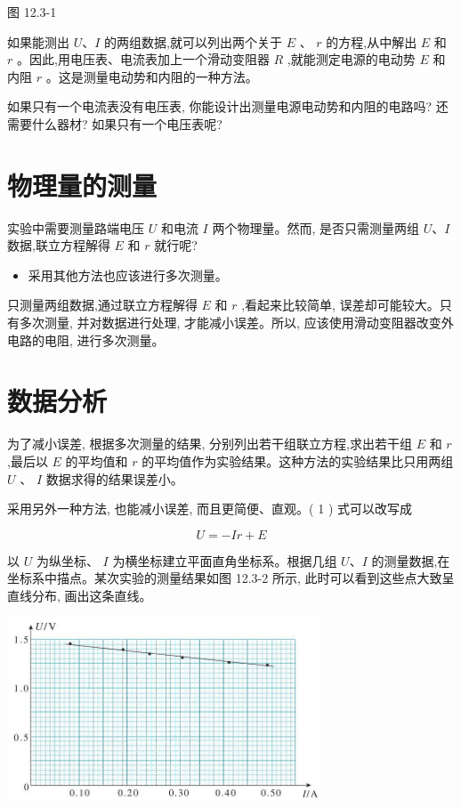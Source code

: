 \documentclass[10pt]{article}
\begin{document}
图 12.3-1

如果能测出 \(U\text{、}I\) 的两组数据,就可以列出两个关于 \(E\) 、 \(r\) 的方程,从中解出 \(E\) 和 \(r\) 。因此,用电压表、电流表加上一个滑动变阻器 \(R\) ,就能测定电源的电动势 \(E\) 和内阻 \(r\) 。这是测量电动势和内阻的一种方法。

如果只有一个电流表没有电压表, 你能设计出测量电源电动势和内阻的电路吗? 还需要什么器材? 如果只有一个电压表呢?

\section*{物理量的测量}

实验中需要测量路端电压 \(U\) 和电流 \(I\) 两个物理量。然而, 是否只需测量两组 \(U\text{、}I\) 数据,联立方程解得 \(E\) 和 \(r\) 就行呢?

\begin{mdframed}

\begin{itemize}
\item 采用其他方法也应该进行多次测量。
\end{itemize}

\end{mdframed}

只测量两组数据,通过联立方程解得 \(E\) 和 \(r\) ,看起来比较简单, 误差却可能较大。只有多次测量, 并对数据进行处理, 才能减小误差。所以, 应该使用滑动变阻器改变外电路的电阻, 进行多次测量。

\section*{数据分析}

为了减小误差, 根据多次测量的结果, 分别列出若干组联立方程,求出若干组 \(E\) 和 \(r\) ,最后以 \(E\) 的平均值和 \(r\) 的平均值作为实验结果。这种方法的实验结果比只用两组 \(U\) 、 \(I\) 数据求得的结果误差小。

采用另外一种方法, 也能减小误差, 而且更简便、直观。( 1 ) 式可以改写成

\[
U = - {Ir} + E \tag{（2）}
\]

以 \(U\) 为纵坐标、 \(I\) 为横坐标建立平面直角坐标系。根据几组 \(U\text{、}I\) 的测量数据,在坐标系中描点。某次实验的测量结果如图 12.3-2 所示, 此时可以看到这些点大致呈直线分布, 画出这条直线。

\begin{center}
\includegraphics[max width=0.7\textwidth]{images/01911d5f-8e38-70c0-b5b8-2b399bd115b6_95_467834.jpg}
\end{center}
\end{document}

